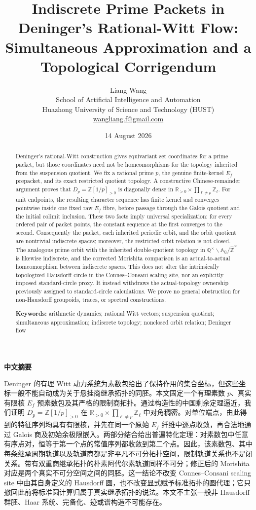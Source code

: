 \documentclass[11pt]{article}
\title{\textbf{Indiscrete Prime Packets in Deninger's Rational-Witt Flow:\\Simultaneous Approximation and a Topological Corrigendum}}
\author{Liang Wang\\
\small School of Artificial Intelligence and Automation\\
\small Huazhong University of Science and Technology (HUST)\\
\small \href{mailto:wangliang.f@gmail.com}{wangliang.f@gmail.com}}
\date{14 August 2026}
\theoremstyle{definition}
\newcommand{\A}{\mathbb{A}}
\newcommand{\Q}{\mathbb{Q}}
\newcommand{\R}{\mathbb{R}}
\newcommand{\Z}{\mathbb{Z}}
\newcommand{\Zhat}{\widehat{\mathbb Z}}
\begin{document}
\maketitle

\begin{abstract}
Deninger's rational-Witt construction gives equivariant set coordinates for a prime packet, but those coordinates need not be homeomorphisms for the topology inherited from the suspension quotient.  We fix a rational prime \(p\), the genuine finite-kernel \(E_f\) prepacket, and its exact restricted quotient topology.  A constructive Chinese-remainder argument proves that \(D_p=\Z[1/p]_{>0}\) is diagonally dense in \(\R_{>0}\times\prod_{\ell\ne p}\Z_\ell\).  For unit endpoints, the resulting character sequence has finite kernel and converges pointwise inside one fixed raw \(E_f\) fibre, before passage through the Galois quotient and the initial colimit inclusion.  These two facts imply universal specialization: for every ordered pair of packet points, the constant sequence at the first converges to the second.  Consequently the packet, each inherited periodic orbit, and the orbit quotient are nontrivial indiscrete spaces; moreover, the restricted orbit relation is not closed.  The analogous prime orbit with the inherited double-quotient topology in \(\Q^\times\backslash\A_{\Q}/\Zhat^\times\) is likewise indiscrete, and the corrected Morishita comparison is an actual-to-actual homeomorphism between indiscrete spaces.  This does not alter the intrinsically topologized Hausdorff circle in the Connes--Consani scaling site, nor an explicitly imposed standard-circle proxy.  It instead withdraws the actual-topology ownership previously assigned to standard-circle calculations.  We prove no general obstruction for non-Hausdorff groupoids, traces, or spectral constructions.

\medskip
\noindent\textbf{Keywords:} arithmetic dynamics; rational Witt vectors; suspension quotient; simultaneous approximation; indiscrete topology; nonclosed orbit relation; Deninger flow
\end{abstract}

\begin{center}
\textbf{中文摘要}
\end{center}
Deninger 的有理 Witt 动力系统为素数包给出了保持作用的集合坐标，但这些坐标一般不能自动成为关于悬挂商继承拓扑的同胚。本文固定一个有理素数 \(p\)、真实有限核 \(E_f\) 预素数包及其严格的限制商拓扑。通过构造性的中国剩余定理逼近，我们证明 \(D_p=\Z[1/p]_{>0}\) 在 \(\R_{>0}\times\prod_{\ell\ne p}\Z_\ell\) 中对角稠密。对单位端点，由此得到的特征序列均具有有限核，并先在同一个原始 \(E_f\) 纤维中逐点收敛，再合法地通过 Galois 商及初始余极限嵌入。两部分结合给出普遍特化定理：对素数包中任意有序点对，恒等于第一个点的常值序列都收敛到第二个点。因此，该素数包、其中每条继承周期轨道以及轨道商都是非平凡不可分拓扑空间，限制轨道关系也不是闭关系。带有双重商继承拓扑的朴素阿代尔素轨道同样不可分；修正后的 Morishita 对应是两个真实不可分空间之间的同胚。这一结论不改变 Connes--Consani scaling site 中由其自身定义的 Hausdorff 圆，也不改变显式赋予标准拓扑的圆代理；它只撤回此前将标准圆计算归属于真实继承拓扑的说法。本文不主张一般非 Hausdorff 群胚、Haar 系统、完备化、迹或谱构造不可能存在。
\end{document}
